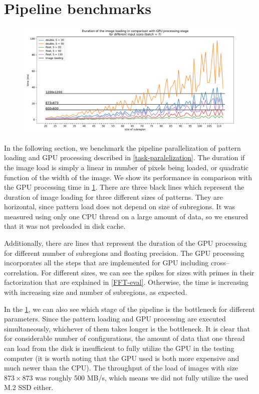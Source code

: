 \section{Pipeline benchmarks}

\begin{figure}
	\centering
	\includegraphics[width=\textwidth]{img/eval/load-plot}
	\caption{}
	\label{load-plot}
\end{figure}

In the following section, we benchmark the pipeline parallelization of pattern loading and GPU processing described in \cref{task-paralelization}. The duration if the image load is simply a linear in number of pixels being loaded, or quadratic function of the width of the image. We show its performance in comparison with the GPU processing time in \cref{load-plot}. There are three black lines which represent the duration of image loading for three different sizes of patterns. They are horizontal, since pattern load does not depend on size of subregions. It was measured using only one CPU thread on a large amount of data, so we ensured that it was not preloaded in disk cache.

Additionally, there are lines that represent the duration of the GPU processing for different number of subregions and floating precision. The GPU processing incorporates all the steps that are implemented for GPU including cross--correlation. For different sizes, we can see the spikes for sizes with primes in their factorization that are explained in \cref{FFT-eval}. Otherwise, the time is increasing with increasing size and number of subregions, as expected.

In the \cref{load-plot}, we can also see which stage of the pipeline is the bottleneck for different parameters. Since the pattern loading and GPU processing are executed simultaneously, whichever of them takes longer is the bottleneck. It is clear that for considerable number of configurations, the amount of data that one thread can load from the disk is insufficient to fully utilize the GPU in the testing computer (it is worth noting that the GPU used is both more expensive and much newer than the CPU). The throughput of the load of images with size $873\times873$ was roughly 500 MB/s, which means we did not fully utilize the used M.2 SSD either.

